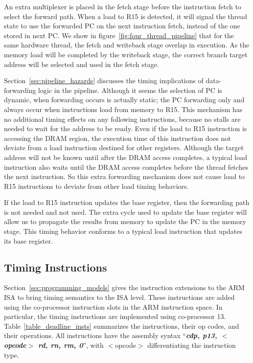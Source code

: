An extra multiplexer is placed in the fetch stage before the instruction fetch to select the forward path.
When a load to R15 is detected, it will signal the thread state to use the forwarded PC on the next instruction fetch, instead of the one stored in next PC.
We show in figure~\ref{fig:four_thread_pipeline} that for the same hardware thread, the fetch and writeback stage overlap in execution.  
As the memory load will be completed by the writeback stage, the correct branch target address will be selected and used in the fetch stage.

Section~\ref{sec:pipeline_hazards} discusses the timing implications of data-forwarding logic in the pipeline.
Although it seems the selection of PC is dynamic, when forwarding occurs is actually static; the PC forwarding only and always occur when instructions load from memory to R15.
This mechanism has no additional timing effects on any following instructions, because no stalls are needed to wait for the address to be ready. 
Even if the load to R15 instruction is accessing the DRAM region, the execution time of this instruction does not deviate from a load instruction destined for other registers.
Although the target address will not be known until after the DRAM access completes, a typical load instruction also waits until the DRAM access completes before the thread fetches the next instruction. 
So this extra forwarding mechanism does not cause load to R15 instructions to deviate from other load timing behaviors.

If the load to R15 instruction updates the base register, then the forwarding path is not needed and not used. 
The extra cycle used to update the base register will allow us to propagate the results from memory to update the PC in the memory stage.
This timing behavior conforms to a typical load instruction that updates its base register. 

\subsection{Timing Instructions}
\label{sec:timing_inst_implementation}
Section~\ref{sec:programming_models} gives the instruction extensions to the ARM ISA to bring timing semantics to the ISA level.
These instructions are added using the co-processor instruction slots in the ARM instruction space. 
In particular, the timing instructions are implemented using co-processor 13.
Table~\ref{table_deadline_insts} summarizes the instructions, their op codes, and their operations.
All instructions have the assembly syntax ``\textbf{\textit{cdp, p13, $<$opcode$>$ rd, rn, rm, 0}}'', with $<$opcode$>$ differentiating the instruction type.
   
